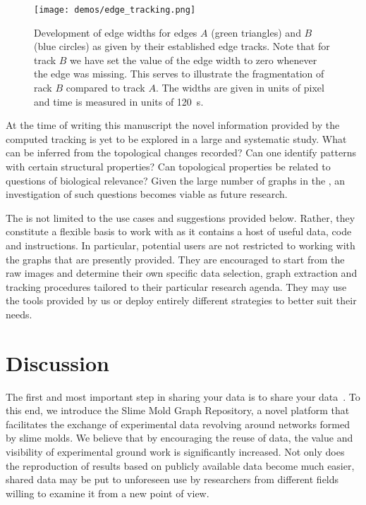     \begin{figure}
		\centering
		\texttt{[image: demos/edge\_tracking.png]}%
		\caption[Demo - Results for tracking individual edges]{Development of edge widths for edges $A$ (green triangles) and $B$ (blue circles) as given by their established edge tracks. Note that for track $B$ we have set the value of the edge width to zero whenever the edge was missing. This serves to illustrate the fragmentation of rack $B$ compared to track $A$. The widths are given in units of pixel and time is measured in units of \SI{120}{\second}.}
		\label{fig:edge_tracking}%
    \end{figure}


	At the time of writing this manuscript the novel information provided by the computed tracking is yet to be explored in a large and systematic study. What can be inferred from the topological changes recorded? Can one identify patterns with certain structural properties? Can topological properties be related to questions of biological relevance? Given the large number of graphs in the \SMGR, an investigation of such questions becomes viable as future research.

	The \data is not limited to the use cases and suggestions provided below. Rather, they constitute a flexible basis to work with as it contains a host of useful data, code and instructions. In particular, potential users are not restricted to working with the graphs that are presently provided. They are encouraged to start from the raw images and determine their own specific data selection, graph extraction and tracking procedures tailored to their particular research agenda. They may use the tools provided by us or deploy entirely different strategies to better suit their needs.

\section{Discussion}

	The first and most important step in sharing your data is to share your data~\cite{white2013nine}. To this end, we introduce the Slime Mold Graph Repository, a novel platform that facilitates the exchange of experimental data revolving around networks formed by slime molds. We believe that by encouraging the reuse of data, the value and visibility of experimental ground work is significantly increased. Not only does the reproduction of results based on publicly available data become much easier, shared data may be put to unforeseen use by researchers from different fields willing to examine it from a new point of view.

